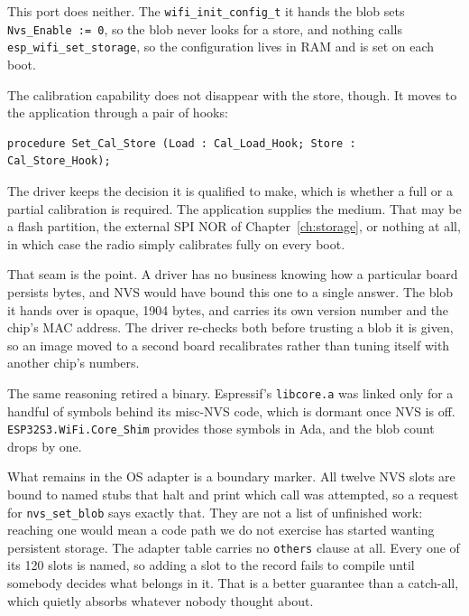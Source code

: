This port does neither. The \texttt{wifi\_init\_config\_t} it hands the blob sets
\lstinline{Nvs_Enable := 0}, so the blob never looks for a store, and nothing
calls \texttt{esp\_wifi\_set\_storage}, so the configuration lives in RAM and is
set on each boot.


The calibration capability does not disappear with the store, though. It moves
to the application through a pair of hooks:

\begin{lstlisting}
procedure Set_Cal_Store (Load : Cal_Load_Hook; Store : Cal_Store_Hook);
\end{lstlisting}

The driver keeps the decision it is qualified to make, which is whether a full or
a partial calibration is required. The application supplies the medium. That may
be a flash partition, the external SPI NOR of Chapter~\ref{ch:storage}, or
nothing at all, in which case the radio simply calibrates fully on every boot.

That seam is the point. A driver has no business knowing how a particular board
persists bytes, and NVS would have bound this one to a single answer. The blob it
hands over is opaque, 1904 bytes, and carries its own version number and the
chip's MAC address. The driver re-checks both before trusting a blob it is given,
so an image moved to a second board recalibrates rather than tuning itself with
another chip's numbers.

The same reasoning retired a binary. Espressif's \texttt{libcore.a} was linked
only for a handful of symbols behind its misc-NVS code, which is dormant once NVS
is off. \texttt{ESP32S3.WiFi.Core\_Shim} provides those symbols in Ada, and the
blob count drops by one.

What remains in the OS adapter is a boundary marker. All twelve NVS slots are
bound to named stubs that halt and print which call was attempted, so a request
for \texttt{nvs\_set\_blob} says exactly that. They are not a list of unfinished
work: reaching one would mean a code path we do not exercise has started wanting
persistent storage. The adapter table carries no \lstinline{others} clause at
all. Every one of its 120 slots is named, so adding a slot to the record fails to
compile until somebody decides what belongs in it. That is a better guarantee
than a catch-all, which quietly absorbs whatever nobody thought about.

